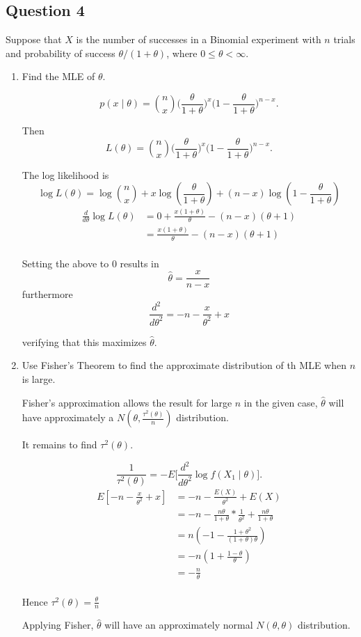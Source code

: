 \documentclass{tufte-book}
\theoremstyle{mytheoremstyle}
\theoremstyle{mylemstyle}
\theoremstyle{mydefstyle}
\begin{document}
\subsection{Question 4}
Suppose that $X$ is the number of successes in a Binomial experiment with $n$ trials and probability of success $\theta/(1+\theta)$, where $0\leq \theta < \infty$.

\begin{enumerate}
\item Find the MLE of $\theta$.

\[p(x\mid \theta) = \binom{n}{x}\Big(\frac{\theta}{1+\theta}\Big)^x\big(1-\frac{\theta}{1+\theta} \Big)^{n-x}. \]

Then
\[L(\theta) = \binom{n}{x}\Big(\frac{\theta}{1+\theta}\Big)^x\big(1-\frac{\theta}{1+\theta} \Big)^{n-x}. \]

The log likelihood is
\[ \log L(\theta) = \log\binom{n}{x} + x \log(\frac{\theta}{1+\theta}) + (n-x)\log(1-\frac{\theta}{1+\theta}) \]
\begin{align*}
\frac{d}{d\theta} \log L(\theta) &= 0 + \frac{x(1+\theta)}{\theta} - (n-x)(\theta+1)\\
&= \frac{x(1+\theta)}{\theta} - (n-x)(\theta+1)\\
\end{align*}

Setting the above to $0$ results in
\[ \hat{\theta} = \frac{x}{n-x} \]
furthermore
\[\frac{d^2}{d\theta^2} = -n - \frac{x}{\theta^2} + x \]

verifying that this maximizes $\hat{\theta}$.

\item Use Fisher's Theorem to find the approximate distribution of th MLE when $n$ is large.

Fisher's approximation allows the result for large $n$ in the given case, $\hat{\theta}$ will have approximately a $N(\theta, \frac{\tau^2(\theta)}{n})$ distribution.

It remains to find $\tau^2(\theta)$.

\[ \frac{1}{\tau^2(\theta)} = -E\Big[ \frac{d^2}{d\theta^2} \log f(X_1\mid \theta)\Big]. \]
\begin{align*}
E[-n - \frac{x}{\theta^2} + x] &= -n - \frac{E(X)}{\theta^2} + E(X)\\
&= -n -\frac{n\theta}{1+\theta}*\frac{1}{\theta^2} + \frac{n\theta}{1+\theta}\\
&= n(-1 - \frac{1+\theta^2}{(1+\theta)\theta})\\
&= -n(1 + \frac{1-\theta}{\theta})\\
&= -\frac{n}{\theta}\\
\end{align*}

Hence $\tau^2(\theta) = \frac{\theta}{n}$

Applying Fisher, $\hat{\theta}$ will have an approximately normal $N(\theta, \theta)$ distribution.

\end{enumerate}
\end{document}
